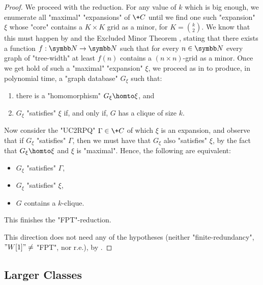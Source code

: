 \begin{proof}
    We proceed with the reduction.
    For any value of $k$ which is big enough, we enumerate all "maximal" "expansions" of $\+C$ until we find one such "expansion" $\xi$ whose "core" contains a $K \times K$ grid as a minor, for $K = {k \choose 2}$.
    We know that this must happen by  and the Excluded Minor Theorem \cite{RobertsonSeymour1986GraphMinors5}, stating that there exists a function $f : \N \to \N$ such that for every $n \in \N$ every graph of "tree-width" at least $f(n)$ contains a $(n \times n)$-grid as a minor.
    Once we get hold of such a "maximal" "expansion" $\xi$, we proceed as in \cite[proof of Theorem~4.1]{Grohe2007ComplexityHomomorphism} to produce, in polynomial time, a "graph database" $G_\xi$ such that:
    \begin{enumerate}
        \item there is a "homomorphism" $G_\xi \homto \xi$, and
        \item $G_\xi$ "satisfies" $\xi$ if, and only if, $G$ has a clique of size $k$.
    \end{enumerate}
Now consider the "UC2RPQ" $\Gamma \in \+C$ of which $\xi$ is an expansion, and observe that if $G_\xi$ "satisfies" $\Gamma$, then we must have that $G_\xi$ also "satisfies" $\xi$, by the fact that $G_\xi \homto \xi$ and $\xi$ is "maximal". Hence, the following are equivalent:
\begin{itemize}
    \item $G_\xi$ "satisfies" $\Gamma$, 
    \item $G_\xi$ "satisfies" $\xi$,
    \item $G$ contains a $k$-clique.
\end{itemize}
This finishes the "FPT"-reduction.

\medskip

 This direction does not need any of the hypotheses (neither "finite-redundancy",  $"W[1]" \neq $ "FPT", nor r.e.), by .
\end{proof}

\subsection{\AP{}Larger Classes}
\label{sec:discussion-larger-classes}

